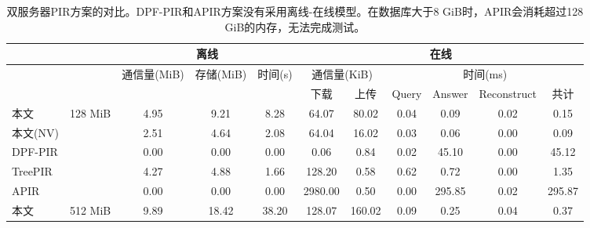 \begin{table}[]
    \caption{双服务器PIR方案的对比。DPF-PIR和APIR方案没有采用离线-在线模型。在数据库大于8 GiB时，APIR会消耗超过128 GiB的内存，无法完成测试。}
    \label{tab:two-server-evaluation}
    \begin{tabular}{@{}lc|ccc|cccccc@{}}
        \toprule
                  & \multicolumn{1}{l|}{}     & \multicolumn{3}{c|}{离线} & \multicolumn{6}{c}{在线}                                                                                                                      \\ \midrule
                  & \multicolumn{1}{l|}{}     & 通信量(MiB)                     & 存储(MiB)                & 时间(s) & \multicolumn{2}{c|}{通信量(KiB)} & \multicolumn{4}{c}{时间(ms)}                                             \\
                  & \multicolumn{1}{l|}{}     &                              &                            &         & 下载                      & \multicolumn{1}{c|}{上传}  & Query & Answer   & Reconstruct & 共计    \\ \midrule
        本文     & \multirow{5}{*}{128 MiB} & 4.95                         & 9.21                       & 8.28    & 64.07                         & \multicolumn{1}{c|}{80.02}   & 0.04  & 0.09     & 0.02        & 0.15     \\
        本文(NV) &                           & 2.51                         & 4.64                       & 2.08    & 64.04                         & \multicolumn{1}{c|}{16.02}   & 0.03  & 0.06     & 0.00        & 0.09     \\
        DPF-PIR       &                           & 0.00                         & 0.00                       & 0.00    & 0.06                          & \multicolumn{1}{c|}{0.84}    & 0.02  & 45.10    & 0.00        & 45.12    \\
        TreePIR   &                           & 4.27                         & 4.88                       & 1.66    & 128.20                        & \multicolumn{1}{c|}{0.58}    & 0.62  & 0.72     & 0.00        & 1.35     \\
        APIR      &                           & 0.00                         & 0.00                       & 0.00    & 2980.00                       & \multicolumn{1}{c|}{0.50}    & 0.00  & 295.85   & 0.02        & 295.87   \\ \midrule
        本文     & \multirow{5}{*}{512 MiB} & 9.89                         & 18.42                      & 38.20   & 128.07                        & \multicolumn{1}{c|}{160.02}  & 0.09  & 0.25     & 0.04        & 0.37     \\

\end{tabular}
\end{table}
